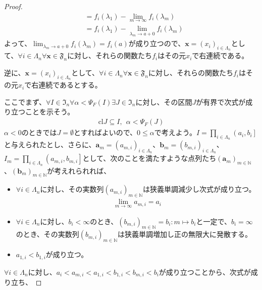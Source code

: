 \documentclass[dvipdfmx]{jsarticle}
\begin{document}
\begin{proof}
\begin{align*}
&= f_{i}\left( \lambda_{1} \right) - \lim_{m \rightarrow \infty}{f_{i}\left( \lambda_{m} \right)}\\
&= f_{i}\left( \lambda_{1} \right) - \lim_{\lambda_{m} \rightarrow a + 0}{f_{i}\left( \lambda_{m} \right)}
\end{align*}
よって、$\lim_{\lambda_{m} \rightarrow a + 0}{f_{i}\left( \lambda_{m} \right)} = f_{i}(a)$が成り立つので、$\mathbf{x} = \left( x_{i} \right)_{i \in \varLambda_{n}}$として、$\forall i \in \varLambda_{n}\forall\mathbf{x} \in \mathfrak{F}_{n}$に対し、それらの関数たち$f_{i}$はその元$x_{i}$で右連続である。\par
逆に、$\mathbf{x} = \left( x_{i} \right)_{i \in \varLambda_{n}}$として、$\forall i \in \varLambda_{n}\forall\mathbf{x} \in \mathfrak{F}_{n}$に対し、それらの関数たち$f_{i}$はその元$x_{i}$で右連続であるとする。\par
ここでまず、$\forall I \in \mathfrak{I}_{n}\forall\alpha < \varPsi_{F}(I)\exists J \in \mathfrak{I}_{n}$に対し、その区間$J$が有界で次式が成り立つことを示そう。
\begin{align*}
\mathrm{cl}J \subseteq I,\ \ \alpha < \varPsi_{F}(J)
\end{align*}
$\alpha < 0$のときでは$J = \emptyset$とすればよいので、$0 \leq \alpha$で考えよう。$I = \prod_{i \in \varLambda_{n}} \left( a_{i},b_{i} \right]$と与えられたとし、さらに、$\mathbf{a}_{m} = \left( a_{m,i} \right)_{i \in \varLambda_{n}}$、$\mathbf{b}_{m} = \left( b_{m,i} \right)_{i \in \varLambda_{n}}$、$I_{m} = \prod_{i \in \varLambda_{n}} \left( a_{m,i},b_{m,i} \right]$として、次のことを満たすような点列たち$\left( \mathbf{a}_{m} \right)_{m \in \mathbb{N}}$、$\left( \mathbf{b}_{m} \right)_{m \in \mathbb{N}}$が考えれられれば、
\begin{itemize}
\item
  $\forall i \in \varLambda_{n}$に対し、その実数列$\left( a_{m,i} \right)_{m \in \mathbb{N}}$は狭義単調減少し次式が成り立つ。
  \begin{align*}
  \lim_{m \rightarrow \infty}a_{m,i} = a_{i}
  \end{align*}
\item
  $\forall i \in \varLambda_{n}$に対し、$b_{i} < \infty$のとき、$\left( b_{m,i} \right)_{m \in \mathbb{N}} = b_{i}:m \mapsto b_{i}$と一定で、$b_{i} = \infty$のとき、その実数列$\left( b_{m,i} \right)_{m \in \mathbb{N}}$は狭義単調増加し正の無限大に発散する。
\item
  $a_{1,i} < b_{1,i}$が成り立つ。
\end{itemize}
$\forall i \in \varLambda_{n}$に対し、$a_{i} < a_{m,i} < a_{1,i} < b_{1,i} < b_{m,i} < b_{i}$が成り立つことから、次式が成り立ち、

\end{proof}
\end{document}

